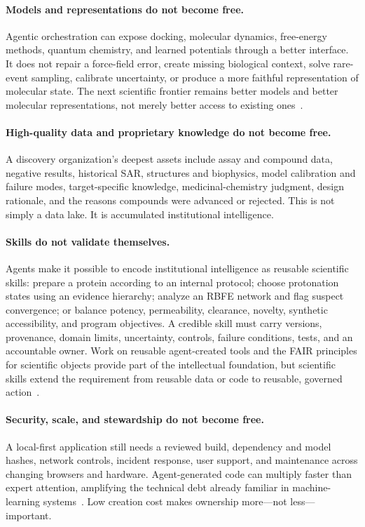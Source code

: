 \documentclass[11pt]{article}
\begin{document}
\paragraph{Models and representations do not become free.}
Agentic orchestration can expose docking, molecular dynamics, free-energy methods, quantum chemistry, and learned potentials through a better interface.
It does not repair a force-field error, create missing biological context, solve rare-event sampling, calibrate uncertainty, or produce a more faithful representation of molecular state.
The next scientific frontier remains better models and better molecular representations, not merely better access to existing ones~\cite{bender2021part1,bender2021part2,wigh2022representation}.

\paragraph{High-quality data and proprietary knowledge do not become free.}
A discovery organization's deepest assets include assay and compound data, negative results, historical SAR, structures and biophysics, model calibration and failure modes, target-specific knowledge, medicinal-chemistry judgment, design rationale, and the reasons compounds were advanced or rejected.
This is not simply a data lake.
It is accumulated institutional intelligence.

\paragraph{Skills do not validate themselves.}
Agents make it possible to encode institutional intelligence as reusable scientific skills: prepare a protein according to an internal protocol; choose protonation states using an evidence hierarchy; analyze an RBFE network and flag suspect convergence; or balance potency, permeability, clearance, novelty, synthetic accessibility, and program objectives.
A credible skill must carry versions, provenance, domain limits, uncertainty, controls, failure conditions, tests, and an accountable owner.
Work on reusable agent-created tools and the FAIR principles for scientific objects provide part of the intellectual foundation, but scientific skills extend the requirement from reusable data or code to reusable, governed action~\cite{cai2024toolmakers,wilkinson2016fair}.

\paragraph{Security, scale, and stewardship do not become free.}
A local-first application still needs a reviewed build, dependency and model hashes, network controls, incident response, user support, and maintenance across changing browsers and hardware.
Agent-generated code can multiply faster than expert attention, amplifying the technical debt already familiar in machine-learning systems~\cite{sculley2015technicaldebt}.
Low creation cost makes ownership more---not less---important.
\end{document}
